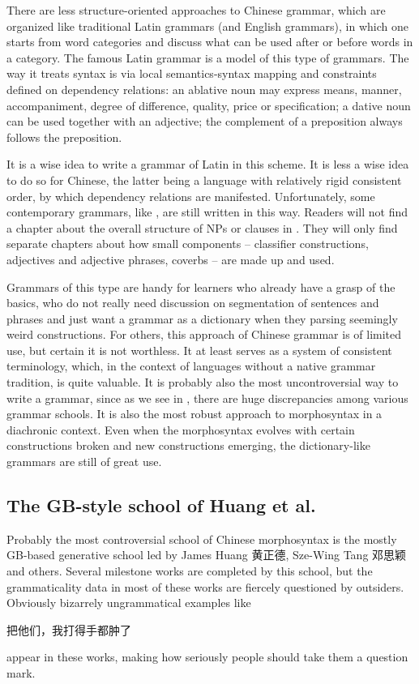 There are less structure-oriented approaches to Chinese grammar, which are organized like traditional 
Latin grammars (and English grammars), in which one starts from word categories and discuss what can be 
used after or before words in a category. The famous Latin grammar \citet{greenough2013allen} is 
a model of this type of grammars. The way it treats syntax is via local semantics-syntax mapping 
and constraints defined on dependency relations: an ablative noun may express means, manner, 
accompaniment, degree of difference, quality, price or specification; a dative noun can be used 
together with an adjective; the complement of a preposition always follows the preposition.

It is a wise idea to write a grammar of Latin in this scheme. It is less a wise idea to do so for Chinese,
the latter being a language with relatively rigid consistent order, by which dependency relations 
are manifested. Unfortunately, some contemporary grammars, like \citet{po2015chinese}, are still 
written in this way. Readers will not find a chapter about the overall structure of NPs or clauses 
in \citet{po2015chinese}. They will only find separate chapters about how small components -- classifier
constructions, adjectives and adjective phrases, coverbs -- are made up and used.

Grammars of this type are handy for learners who already have a grasp of the basics, who do not really need 
discussion on segmentation of sentences and phrases and just want a grammar as a dictionary when they 
parsing seemingly weird constructions. For others, this approach of Chinese grammar is of limited use,
but certain it is not worthless. It at least serves as a system of consistent terminology, which, in 
the context of languages without a native grammar tradition, is quite valuable. It is probably also 
the most uncontroversial way to write a grammar, since as we see in ,
there are huge discrepancies among various grammar schools. It is also the most robust approach to 
morphosyntax in a diachronic context. Even when the morphosyntax evolves with certain constructions broken 
and new constructions emerging, the dictionary-like grammars are still of great use. 

\subsection{The GB-style school of Huang et al.}\label{sec:gb-grammar}

Probably the most controversial school of Chinese morphosyntax is the mostly GB-based generative school led by James Huang 黄正德, 
Sze-Wing Tang 邓思颖 and others. Several milestone works are completed by this school, but the grammaticality 
data in most of these works are fiercely questioned by outsiders. Obviously bizarrely ungrammatical examples 
like \citep[sec. 5.4.2, (65)]{huang2013} 
\begin{exe}
    \ex\label{ex:huang-weird-1} 把他们，我打得手都肿了
\end{exe}
appear in these works, making how seriously people should take them a question mark.

